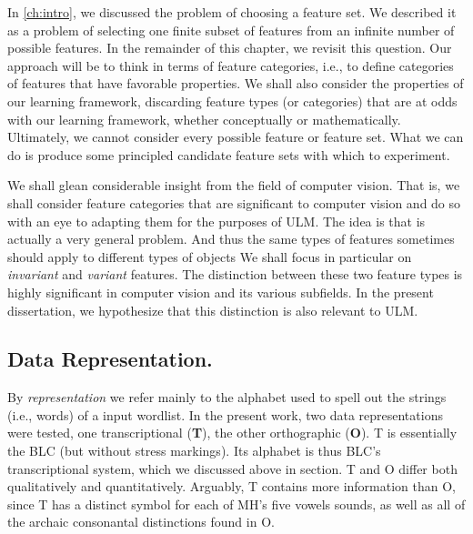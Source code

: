 
In \ref{ch:intro}, we discussed the problem of choosing a feature set. We described it as a problem of selecting one finite subset of 
features from an infinite number of possible features.
In the remainder of this chapter, we revisit this question. Our approach will be to think in terms of feature categories, i.e., to define categories of features that have favorable properties. We shall also consider the properties of our learning framework, discarding feature types (or categories) that are at odds with our learning framework, whether conceptually or mathematically. Ultimately, we cannot consider every possible feature or feature set. What we can do is produce some principled candidate feature sets with which to experiment. 

We shall glean considerable insight
from the field of computer vision. That is, we shall consider feature categories that 
are significant to computer vision and do so with an eye to adapting them for the purposes of ULM. The idea is that 
is actually a very general problem. And thus the
same types of features sometimes should apply to different types of objects
We shall focus in particular on \emph{invariant} and \emph{variant} features. 
The distinction between these two feature types is highly significant in
computer vision and its various subfields. In the present dissertation, we hypothesize that this distinction is
also relevant to ULM. 


\subsection {Data Representation.} 
By \emph{representation} we refer mainly to the alphabet used to spell out the strings (i.e., words) 
of a input wordlist.
In the present work, two data representations were tested, one transcriptional 
(\textbf{T}), the other orthographic (\textbf{O}). 
T is essentially the BLC (but without stress markings). Its alphabet is thus BLC's 
transcriptional system, which we discussed above in section. %
T and O differ both qualitatively and quantitatively. 
Arguably, T contains more information than O,
since T has a distinct symbol for each of MH's five vowels sounds, %
as well as all of the archaic consonantal distinctions found in O.

